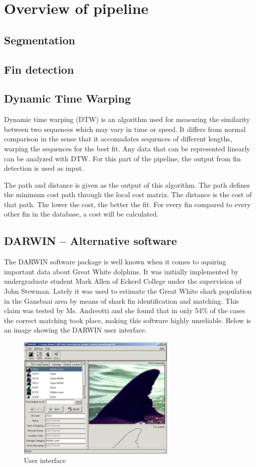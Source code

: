 \documentclass[a4paper,10pt]{article}
\begin{document}
\section{Overview of pipeline}
\subsection{Segmentation}

\subsection{Fin detection}

\subsection{Dynamic Time Warping}
Dynamic time warping (DTW) is an algorithm used for measuring the similarity between two sequences which may vary in time or speed.
It differs from normal comparison in the sense that it accomadates sequences of different lengths, warping the sequences for the best fit.
Any data that can be represented linearly can be analyzed with DTW.  For this part of the pipeline, the output from fin detection is used as input.

The path and distance is given as the output of this algorithm. The path defines the minimum cost path through the local cost matrix. 
The distance is the cost of that path. 
The lower the cost, the better the fit. For every fin compared to every other fin in the database, a cost will be calculated.

\subsection{DARWIN -- Alternative software}
The DARWIN\cite{Darwin} software package is well known when it comes to aquiring important data about Great White dolphins.  It was initially implemented by undergraduate 
student Mark Allen of Eckerd College under the supervision of John Stewman.  Lately it was used to estimate the Great White
shark population in the Gansbaai area by means of shark fin identification and matching.  This claim was tested by Ms. Andreotti and she found that in only
54\% of the cases the correct matching took place, making this software highly
unreliable.  Below is an image showing the DARWIN user interface. 

\begin{figure}[H]
 \centering
 \includegraphics[width=3in]{Darwin.jpg}
 \caption{User interface}
\end{figure}
\end{document}
